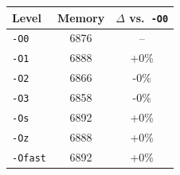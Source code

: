 \begin{tabular*}{\columnwidth}{@{\extracolsep\fill}lcc@{\extracolsep\fill}}
\toprule
\textbf{Level} & \textbf{Memory} & \textbf{$\Delta$ vs.\ \texttt{-O0}} \\
\midrule
\texttt{-O0} & 6876 & -- \\
\texttt{-O1} & 6888 & +0\% \\
\texttt{-O2} & 6866 & -0\% \\
\texttt{-O3} & 6858 & -0\% \\
\texttt{-Os} & 6892 & +0\% \\
\texttt{-Oz} & 6888 & +0\% \\
\texttt{-Ofast} & 6892 & +0\% \\
\bottomrule
\end{tabular*}
